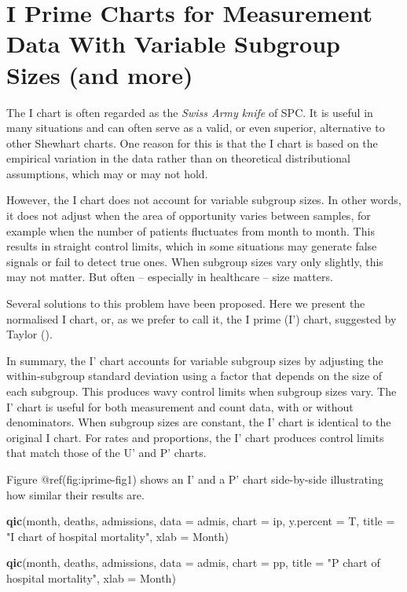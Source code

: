 \documentclass[
]{book}
\newenvironment{Shaded}{\begin{snugshade}}{\end{snugshade}}
\newcommand{\AttributeTok}[1]{\textcolor[rgb]{0.13,0.29,0.53}{#1}}
\newcommand{\FunctionTok}[1]{\textcolor[rgb]{0.13,0.29,0.53}{\textbf{#1}}}
\newcommand{\NormalTok}[1]{#1}
\newcommand{\StringTok}[1]{\textcolor[rgb]{0.31,0.60,0.02}{#1}}
\begin{document}
\chapter{I Prime Charts for Measurement Data With Variable Subgroup
Sizes (and
more)}\label{i-prime-charts-for-measurement-data-with-variable-subgroup-sizes-and-more}

The I chart is often regarded as the \emph{Swiss Army knife} of SPC. It
is useful in many situations and can often serve as a valid, or even
superior, alternative to other Shewhart charts. One reason for this is
that the I chart is based on the empirical variation in the data rather
than on theoretical distributional assumptions, which may or may not
hold.

However, the I chart does not account for variable subgroup sizes. In
other words, it does not adjust when the area of opportunity varies
between samples, for example when the number of patients fluctuates from
month to month. This results in straight control limits, which in some
situations may generate false signals or fail to detect true ones. When
subgroup sizes vary only slightly, this may not matter. But often --
especially in healthcare -- size matters.

Several solutions to this problem have been proposed. Here we present
the normalised I chart, or, as we prefer to call it, the I prime (I')
chart, suggested by Taylor ().

In summary, the I' chart accounts for variable subgroup sizes by
adjusting the within-subgroup standard deviation using a factor that
depends on the size of each subgroup. This produces wavy control limits
when subgroup sizes vary. The I' chart is useful for both measurement
and count data, with or without denominators. When subgroup sizes are
constant, the I' chart is identical to the original I chart. For rates
and proportions, the I' chart produces control limits that match those
of the U' and P' charts.

Figure @ref(fig:iprime-fig1) shows an I' and a P' chart side-by-side
illustrating how similar their results are.

\begin{Shaded}
\begin{Highlighting}[]
\FunctionTok{qic}\NormalTok{(month, deaths, admissions, }
    \AttributeTok{data      =}\NormalTok{ admis, }
    \AttributeTok{chart     =} \StringTok{\textquotesingle{}ip\textquotesingle{}}\NormalTok{, }
    \AttributeTok{y.percent =}\NormalTok{ T,}
    \AttributeTok{title     =} \StringTok{"I\textquotesingle{} chart of hospital mortality"}\NormalTok{,}
    \AttributeTok{xlab      =} \StringTok{\textquotesingle{}Month\textquotesingle{}}\NormalTok{)}

\FunctionTok{qic}\NormalTok{(month, deaths, admissions, }
    \AttributeTok{data  =}\NormalTok{ admis, }
    \AttributeTok{chart =} \StringTok{\textquotesingle{}pp\textquotesingle{}}\NormalTok{,}
    \AttributeTok{title =} \StringTok{"P\textquotesingle{} chart of hospital mortality"}\NormalTok{,}
    \AttributeTok{xlab  =} \StringTok{\textquotesingle{}Month\textquotesingle{}}\NormalTok{)}
\end{Highlighting}
\end{Shaded}
\end{document}
